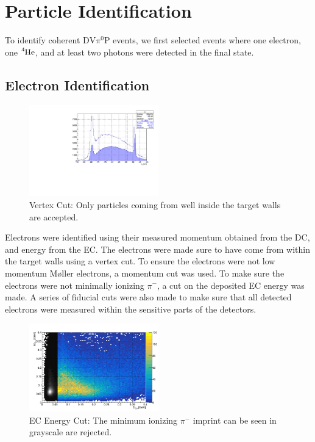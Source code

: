 \documentclass[10pt,prd,aps,showpacs,twocolumn,unsortedaddress]{revtex4-1}
\newcommand\he{{\ce{^{4}He}}}
\newcommand\pio{{\pi^0}}
\newcommand\pim{{\pi^-}}
\newcommand\dvmp{{\text{DV}\pio\text{P}}}
\newcommand\moller{{M{\o}ller} }
\begin{document}
\section{Particle Identification \label{pid}}
To identify coherent $\dvmp$ events, we first selected events where one electron, one $\he$, and at least two photons were detected in the final state. 

\subsection{Electron Identification}
        \begin{figure}[h!]
            \includegraphics[width=0.5\textwidth]{figs/pid/e/pdf/vz_good}
          \caption[...]{Vertex Cut: Only particles coming from well inside the target walls are accepted.} 
        \end{figure}
Electrons were identified using their measured momentum
obtained from the DC, 
and energy from the EC. The electrons were made sure to have come from within the target walls using a vertex cut.
To ensure the electrons were not low momentum \moller electrons, a momentum cut was used. 
To make sure the electrons were not minimally ionizing $\pim$, a cut on the deposited EC energy was made. 
A series of fiducial cuts were also made to make sure that all detected electrons were measured within the sensitive parts of 
the detectors.
        \begin{figure}[h!]
          \centering
          \captionsetup{width=\linewidth}
            \includegraphics[width=0.5\textwidth]{figs/pid/e/ec_EOvEI.png}
          \caption[...]{EC Energy Cut: The minimum ionizing $\pi^-$ imprint can be seen in grayscale are rejected.} 
          \label{fig:pid:e:ec_e}
        \end{figure}
\end{document}

